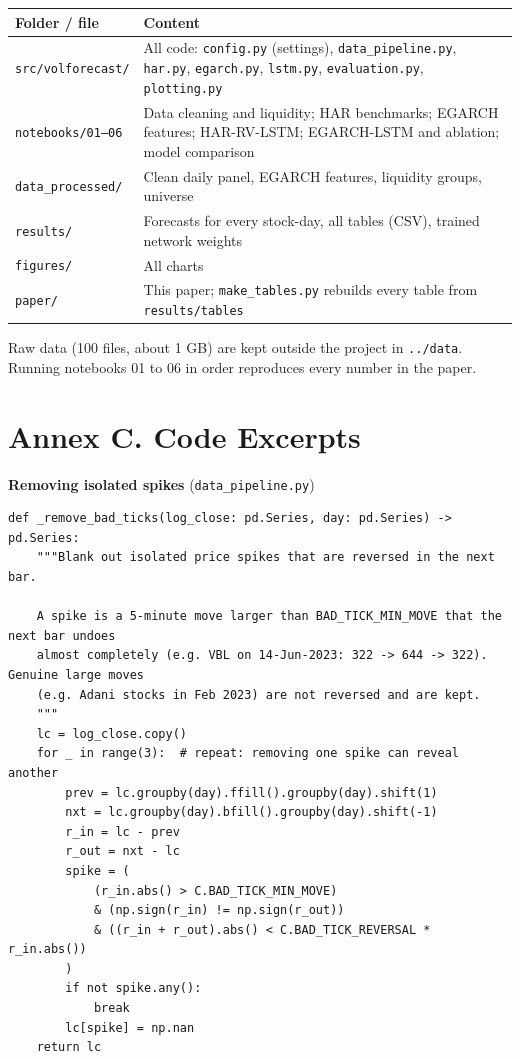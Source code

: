 \documentclass[11pt,a4paper]{article}
\let\oldsection\section
\renewcommand{\section}{\FloatBarrier\needspace{6\baselineskip}\oldsection}
\begin{document}
\begin{tabularx}{\textwidth}{lX}
\toprule
Folder / file & Content \\
\midrule
\texttt{src/volforecast/} & All code: \texttt{config.py} (settings), \texttt{data\_pipeline.py}, \texttt{har.py},
\texttt{egarch.py}, \texttt{lstm.py}, \texttt{evaluation.py}, \texttt{plotting.py} \\
\texttt{notebooks/01--06} & Data cleaning and liquidity; HAR benchmarks; EGARCH features; HAR-RV-LSTM;
EGARCH-LSTM and ablation; model comparison \\
\texttt{data\_processed/} & Clean daily panel, EGARCH features, liquidity groups, universe \\
\texttt{results/} & Forecasts for every stock-day, all tables (CSV), trained network weights \\
\texttt{figures/} & All charts \\
\texttt{paper/} & This paper; \texttt{make\_tables.py} rebuilds every table from \texttt{results/tables} \\
\bottomrule
\end{tabularx}

Raw data (100 files, about 1 GB) are kept outside the project in \texttt{../data}. Running notebooks
01 to 06 in order reproduces every number in the paper.

\section*{Annex C. Code Excerpts}

\textbf{Removing isolated spikes} (\texttt{data\_pipeline.py})
\begin{lstlisting}
def _remove_bad_ticks(log_close: pd.Series, day: pd.Series) -> pd.Series:
    """Blank out isolated price spikes that are reversed in the next bar.

    A spike is a 5-minute move larger than BAD_TICK_MIN_MOVE that the next bar undoes
    almost completely (e.g. VBL on 14-Jun-2023: 322 -> 644 -> 322). Genuine large moves
    (e.g. Adani stocks in Feb 2023) are not reversed and are kept.
    """
    lc = log_close.copy()
    for _ in range(3):  # repeat: removing one spike can reveal another
        prev = lc.groupby(day).ffill().groupby(day).shift(1)
        nxt = lc.groupby(day).bfill().groupby(day).shift(-1)
        r_in = lc - prev
        r_out = nxt - lc
        spike = (
            (r_in.abs() > C.BAD_TICK_MIN_MOVE)
            & (np.sign(r_in) != np.sign(r_out))
            & ((r_in + r_out).abs() < C.BAD_TICK_REVERSAL * r_in.abs())
        )
        if not spike.any():
            break
        lc[spike] = np.nan
    return lc
\end{lstlisting}
\end{document}
